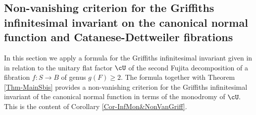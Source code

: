 \documentclass[a4paper,11pt]{amsart}
\begin{document}
{ 					 			\subsection{Non-vanishing criterion for the Griffiths infinitesimal invariant on the canonical normal function and Catanese-Dettweiler fibrations}\label{SubSec-NonVanCriteria}
 					 			
 					 			In this section we apply a formula for the Griffiths infinitesimal invariant given in \cite{C-P_TheGriffiths_1995} in relation to the unitary flat factor $\cU$ of the second Fujita decomposition of a fibration $f:S\to B$ of genus $g(F)\geq 2.$ The formula together with Theorem \ref{Thm-MainSbis} provides a non-vanishing criterion for the Griffiths infinitesimal invariant of the canonical normal function in terms of the monodromy of $\cU.$ This is the content of Corollary \ref{Cor-InfMon&NonVanGriff}.
 					 			
}
\end{document}
